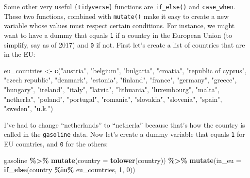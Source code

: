 \documentclass[
]{article}
\newenvironment{Shaded}{\begin{snugshade}}{\end{snugshade}}
\newcommand{\DataTypeTok}[1]{\textcolor[rgb]{0.13,0.29,0.53}{#1}}
\newcommand{\DecValTok}[1]{\textcolor[rgb]{0.00,0.00,0.81}{#1}}
\newcommand{\KeywordTok}[1]{\textcolor[rgb]{0.13,0.29,0.53}{\textbf{#1}}}
\newcommand{\NormalTok}[1]{#1}
\newcommand{\OperatorTok}[1]{\textcolor[rgb]{0.81,0.36,0.00}{\textbf{#1}}}
\newcommand{\StringTok}[1]{\textcolor[rgb]{0.31,0.60,0.02}{#1}}
\begin{document}
Some other very useful \texttt{\{tidyverse\}} functions are \texttt{if\_else()} and \texttt{case\_when}. These two
functions, combined with \texttt{mutate()} make it easy to create a new variable whose values must
respect certain conditions. For instance, we might want to have a dummy that equals \texttt{1} if a country
in the European Union (to simplify, say as of 2017) and \texttt{0} if not. First let's create a list of
countries that are in the EU:

\begin{Shaded}
\begin{Highlighting}[]
\NormalTok{eu\_countries \textless{}{-}}\StringTok{ }\KeywordTok{c}\NormalTok{(}\StringTok{"austria"}\NormalTok{, }\StringTok{"belgium"}\NormalTok{, }\StringTok{"bulgaria"}\NormalTok{, }\StringTok{"croatia"}\NormalTok{, }\StringTok{"republic of cyprus"}\NormalTok{,}
                  \StringTok{"czech republic"}\NormalTok{, }\StringTok{"denmark"}\NormalTok{, }\StringTok{"estonia"}\NormalTok{, }\StringTok{"finland"}\NormalTok{, }\StringTok{"france"}\NormalTok{, }\StringTok{"germany"}\NormalTok{,}
                  \StringTok{"greece"}\NormalTok{, }\StringTok{"hungary"}\NormalTok{, }\StringTok{"ireland"}\NormalTok{, }\StringTok{"italy"}\NormalTok{, }\StringTok{"latvia"}\NormalTok{, }\StringTok{"lithuania"}\NormalTok{, }\StringTok{"luxembourg"}\NormalTok{,}
                  \StringTok{"malta"}\NormalTok{, }\StringTok{"netherla"}\NormalTok{, }\StringTok{"poland"}\NormalTok{, }\StringTok{"portugal"}\NormalTok{, }\StringTok{"romania"}\NormalTok{, }\StringTok{"slovakia"}\NormalTok{, }\StringTok{"slovenia"}\NormalTok{,}
                  \StringTok{"spain"}\NormalTok{, }\StringTok{"sweden"}\NormalTok{, }\StringTok{"u.k."}\NormalTok{)}
\end{Highlighting}
\end{Shaded}

I've had to change ``netherlands'' to ``netherla'' because that's how the country is called in the
\texttt{gasoline} data. Now let's create a dummy variable that equals \texttt{1} for EU countries, and \texttt{0} for the others:

\begin{Shaded}
\begin{Highlighting}[]
\NormalTok{gasoline }\OperatorTok{\%\textgreater{}\%}
\StringTok{  }\KeywordTok{mutate}\NormalTok{(}\DataTypeTok{country =} \KeywordTok{tolower}\NormalTok{(country)) }\OperatorTok{\%\textgreater{}\%}
\StringTok{  }\KeywordTok{mutate}\NormalTok{(}\DataTypeTok{in\_eu =} \KeywordTok{if\_else}\NormalTok{(country }\OperatorTok{\%in\%}\StringTok{ }\NormalTok{eu\_countries, }\DecValTok{1}\NormalTok{, }\DecValTok{0}\NormalTok{))}
\end{Highlighting}
\end{Shaded}
\end{document}
